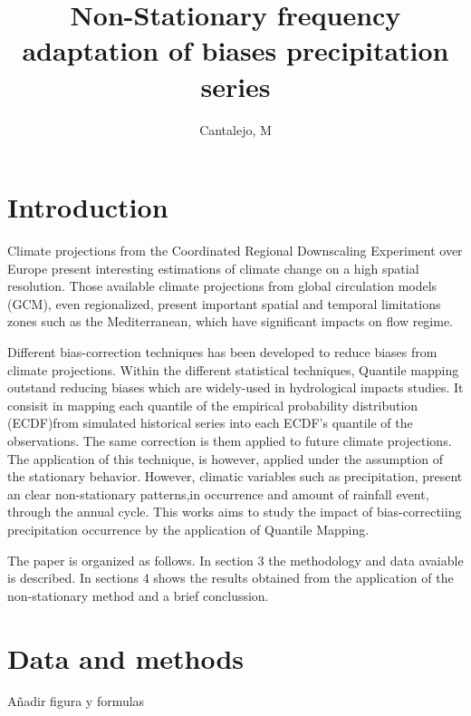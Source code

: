 \documentclass[a4paper,11pt]{article}
\begin{document}
\title{Non-Stationary frequency adaptation of biases precipitation series}
\author{Cantalejo, M}
\maketitle
{}



\section{Introduction}\label{sec1}
Climate projections from the Coordinated Regional Downscaling Experiment over Europe present interesting estimations of climate change on a high spatial resolution. Those available climate projections  from global circulation models (GCM), even regionalized, present important spatial and temporal limitations zones such as the Mediterranean, which have significant impacts on flow regime.

Different bias-correction techniques has been developed to reduce biases from climate projections. Within the different statistical techniques, Quantile mapping outstand reducing biases which are widely-used in hydrological impacts studies. It consisit in mapping each quantile of the empirical probability distribution (ECDF)from simulated historical series into each ECDF's quantile of the observations. The same correction is them applied to future climate projections. The application of this technique, is however, applied under the assumption of the stationary behavior. However, climatic variables such as precipitation, present an clear non-stationary patterns,in occurrence and amount of rainfall event, through the annual cycle. This works aims to study the impact of bias-correctiing precipitation occurrence by the application of Quantile Mapping. 

The paper is organized as follows. In section 3 the methodology and data avaiable is described. In sections 4 shows the results obtained from the application of the non-stationary method and a brief conclussion.  


\section{Data and methods}\label{sec2}
Añadir figura y formulas 
\end{document}
